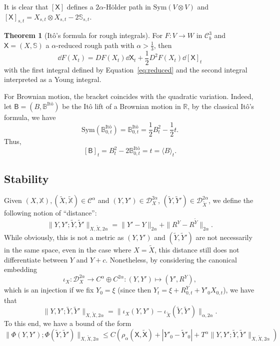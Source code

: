 \documentclass[]{article}
\theoremstyle{definition}
\newtheorem{theorem}{Theorem}
\theoremstyle{definition}
\begin{document}
It is clear that \([\mathsf{X}]\) defines a \(2\alpha\)-H\"older path in \(\text{Sym}(V \otimes V)\) 
and \([\mathsf{X}]_{s, t} = X_{s, t} \otimes X_{s, t} - 2 \mathbb{S}_{s, t}\).
\begin{theorem}[It\^o's formula for rough integrals]
  For \(F : V \to W\) in \(\mathcal{C}^3_b\) and \(\mathsf{X} = (X, \mathbb{S})\) a \(\alpha\)-reduced rough path 
  with \(\alpha > \frac{1}{3}\), then 
  \[\dd F(X_t) = DF(X_t) \dd \mathsf{X}_t + \frac{1}{2} D^2F(X_t) \dd{} [\mathsf{X}]_t\]
  with the first integral defined by Equation~\eqref{eq:reduced} and the second integral interpreted as 
  a Young integral.
\end{theorem}
For Brownian motion, the bracket coincides with the quadratic variation. Indeed, let 
\(\mathsf{B} = (B, \mathbb{B}^{\text{It\^o}})\) be the It\^o lift of a Brownian motion in \(\mathbb{R}\), 
by the classical It\^o's formula, we have 
\[\text{Sym}(\mathbb{B}^{\text{It\^o}}_{0, t}) = \mathbb{B}^{\text{It\^o}}_{0, t}
  = \frac{1}{2}B_t^2 - \frac{1}{2} t.\]
Thus, 
\[[\mathsf{B}]_t = B_t^2 - 2\mathbb{B}^{\text{It\^o}}_{0, t} = t = \langle B\rangle_t.\]

\subsection*{Stability}

Given \((X, \mathbb{X}), (\tilde X, \tilde{\mathbb{X}}) \in \mathcal{C}^\alpha\) and \((Y, Y') \in \mathcal{D}^{2\alpha}_X\),
\((\tilde Y, \tilde Y') \in \mathcal{D}^{2\alpha}_{\tilde X}\), we define the following notion of ``distance'':
\[\|Y, Y'; \tilde Y, \tilde Y'\|_{X, \tilde X, 2\alpha} = \|Y' - Y\|_{2\alpha} + \|R^Y - R^{\tilde Y}\|_{2 \alpha}.\]
While obviously, this is not a metric as \((Y, Y')\) and \((\tilde Y, \tilde Y')\) are not necessarily in the same space, 
even in the case where \(X = \tilde X\), this distance still does not differentiate between \(Y\) and \(Y + c\). 
Nonetheless, by considering the canonical embedding 
\[\iota_X : \mathcal{D}^{2\alpha}_X \to C^\alpha \oplus C^{2\alpha} : (Y, Y') \mapsto (Y', R^Y),\]
which is an injection if we fix \(Y_0 = \xi\) (since then \(Y_t = \xi + R^Y_{0, t} + Y'_0 X_{0, t}\)), we have that 
\[\|Y, Y'; \tilde Y, \tilde Y'\|_{X, \tilde X, 2\alpha} = \|\iota_X(Y, Y') - \iota_{\tilde X}(\tilde Y, \tilde Y')\|_{\alpha, 2\alpha}.\]
To this end, we have a bound of the form 
\[\|\Phi(Y, Y'); \Phi(\tilde Y, \tilde Y')\|_{X, \tilde X, 2\alpha} \le 
  C(\rho_\alpha(\mathsf{X}, \tilde{\mathsf{X}}) + |Y'_0 - \tilde{Y}'_0| + T^\alpha \|Y, Y'; \tilde Y, \tilde Y'\|_{X, \tilde X, 2\alpha})\]
\end{document}
